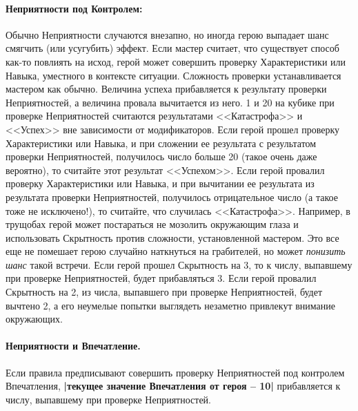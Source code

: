 \paragraph{Неприятности под Контролем:} Обычно Неприятности случаются внезапно, но иногда герою выпадает шанс смягчить (или усугубить) эффект. Если мастер считает, что существует способ как-то повлиять на исход, герой может совершить проверку Характеристики или Навыка, уместного в контексте ситуации. Сложность проверки устанавливается мастером как обычно. Величина успеха прибавляется к результату проверки Неприятностей, а величина провала вычитается из него. 1 и 20 на кубике при проверке Неприятностей считаются результатами <<Катастрофа>> и <<Успех>> вне зависимости от модификаторов.
\newline Если герой прошел проверку Характеристики или Навыка, и при сложении ее результата с результатом проверки Неприятностей, получилось число больше 20 (такое очень даже вероятно), то считайте этот результат <<Успехом>>. Если герой провалил проверку Характеристики или Навыка, и при вычитании ее результата из результата проверки Неприятностей, получилось отрицательное число (а такое тоже не исключено!), то считайте, что случилась <<Катастрофа>>.
\newline Например, в трущобах герой может постараться не мозолить окружающим глаза и использовать Скрытность против сложности, установленной мастером. Это все еще не помешает герою случайно наткнуться на грабителей, но может \textit{понизить шанс} такой встречи. Если герой прошел Скрытность на 3, то к числу, выпавшему при проверке Неприятностей, будет прибавляться 3. Если герой провалил Скрытность на 2, из числа, выпавшего при проверке Неприятностей, будет вычтено 2, а его неумелые попытки выглядеть незаметно привлекут внимание окружающих.
\paragraph{Неприятности и Впечатление.} Если правила предписывают совершить проверку Неприятностей под контролем Впечатления, \textbf{|текущее значение Впечатления от героя – 10|} прибавляется к числу, выпавшему при проверке Неприятностей.
